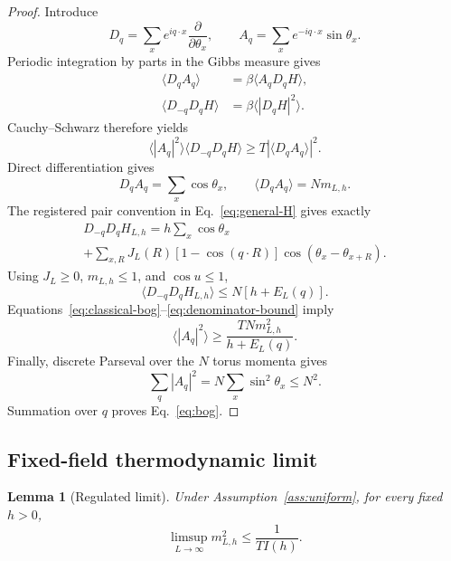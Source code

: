 \documentclass[aps,prb,twocolumn,groupedaddress,amsmath,amssymb,
               superscriptaddress,nofootinbib,floatfix]{revtex4-2}
\theoremstyle{plain}
\newtheorem{lemma}{Lemma}
\theoremstyle{definition}
\begin{document}
\begin{proof}
Introduce
\begin{equation}
 D_q=\sum_xe^{iq\cdot x}\frac{\partial}{\partial\theta_x},
 \qquad
 A_q=\sum_xe^{-iq\cdot x}\sin\theta_x .
\label{eq:D-A}
\end{equation}
Periodic integration by parts in the Gibbs measure gives
\begin{align}
 \langle D_qA_q\rangle
 &=\beta\langle A_qD_qH\rangle,
\label{eq:ibp-one}\\
 \langle D_{-q}D_qH\rangle
 &=\beta\langle|D_qH|^2\rangle.
\label{eq:ibp-two}
\end{align}
Cauchy--Schwarz therefore yields
\begin{equation}
 \langle|A_q|^2\rangle
 \langle D_{-q}D_qH\rangle
 \ge
 T|\langle D_qA_q\rangle|^2.
\label{eq:classical-bog}
\end{equation}
Direct differentiation gives
\begin{equation}
 D_qA_q=\sum_x\cos\theta_x,
 \qquad
 \langle D_qA_q\rangle=Nm_{L,h}.
\end{equation}
The registered pair convention in Eq.~\eqref{eq:general-H} gives exactly
\begin{multline}
 D_{-q}D_qH_{L,h}
 =h\sum_x\cos\theta_x\\
 +\sum_{x,R}J_L(R)[1-\cos(q\cdot R)]
 \cos(\theta_x-\theta_{x+R}).
\label{eq:second-derivative}
\end{multline}
Using $J_L\ge0$, $m_{L,h}\le1$, and $\cos u\le1$,
\begin{equation}
 \langle D_{-q}D_qH_{L,h}\rangle
 \le N[h+E_L(q)].
\label{eq:denominator-bound}
\end{equation}
Equations~\eqref{eq:classical-bog}--\eqref{eq:denominator-bound} imply
\begin{equation}
 \langle|A_q|^2\rangle
 \ge\frac{TNm_{L,h}^2}{h+E_L(q)}.
\end{equation}
Finally, discrete Parseval over the $N$ torus momenta gives
\begin{equation}
 \sum_q|A_q|^2
 =N\sum_x\sin^2\theta_x\le N^2.
\end{equation}
Summation over $q$ proves Eq.~\eqref{eq:bog}.
\end{proof}

\subsection{Fixed-field thermodynamic limit}

\begin{lemma}[Regulated limit]
\label{lem:regulated}
Under Assumption~\ref{ass:uniform}, for every fixed $h>0$,
\begin{equation}
 \limsup_{L\to\infty}m_{L,h}^2
 \le\frac1{TI(h)}.
\label{eq:regulated-bound}
\end{equation}
\end{lemma}
\end{document}
